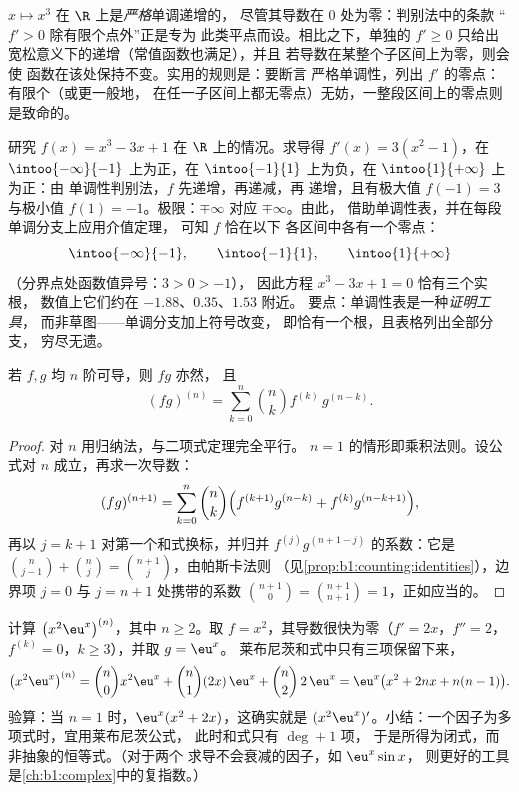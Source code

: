 \begin{example}[免费的严格性]\label{ex:b1:derivative:strictness}
$x \mapsto x^3$ 在 $\R$ 上是\emph{严格}单调递增的，
尽管其导数在 $0$ 处为零：判别法中的条款
“$f' > 0$ 除有限个点外”正是专为
此类平点而设。相比之下，单独的 $f' \geq 0$ 只给出
宽松意义下的递增（常值函数也满足），并且
若导数在某整个子区间上为零，则会使
函数在该处保持不变。实用的规则是：要断言
严格单调性，列出 $f'$ 的零点：有限个（或更一般地，
在任一子区间上都无零点）无妨，一整段区间上的零点则
是致命的。
\end{example}

\begin{example}[完整的单调性分析]\label{ex:b1:derivative:variations}
研究 $f(x) = x^3 - 3x + 1$ 在 $\R$ 上的情况。求导得 $f'(x) =
3(x^2 - 1)$，在 $\intoo{-\infty}{-1}$ 上为正，在
$\intoo{-1}{1}$ 上为负，在 $\intoo{1}{+\infty}$ 上为正：由
单调性判别法，$f$ 先递增，再递减，再
递增，且有极大值 $f(-1) = 3$ 与极小值
$f(1) = -1$。极限：$\mp\infty$ 对应 $\mp\infty$。由此，
借助单调性表，并在每段单调分支上应用介值定理，
可知 $f$ 恰在以下
各区间中各有一个零点：
\[
\intoo{-\infty}{-1}, \qquad \intoo{-1}{1}, \qquad
\intoo{1}{+\infty}
\]
（分界点处函数值异号：$3 > 0 > -1$），
因此方程 $x^3 - 3x + 1 = 0$ 恰有三个实根，
数值上它们约在 $-1.88$、$0.35$、$1.53$ 附近。
要点：单调性表是一种\emph{证明工具}，
而非草图——单调分支加上符号改变，
即恰有一个根，且表格列出全部分支，
穷尽无遗。
\end{example}

\begin{theorem}[莱布尼茨公式]\label{thm:b1:derivative:leibniz}
若 $f, g$ 均 $n$ 阶可导，则 $fg$ 亦然，
且
\[
(fg)^{(n)} = \sum_{k=0}^{n} \binom nk f^{(k)}\, g^{(n-k)} .
\]
\end{theorem}

\begin{proof}
对 $n$ 用归纳法，与二项式定理完全平行。
$n = 1$ 的情形即乘积法则。设公式对
$n$ 成立，再求一次导数：
\[
(fg)^{(n+1)} = \sum_{k=0}^{n} \binom nk
\Bigl( f^{(k+1)} g^{(n-k)} + f^{(k)} g^{(n-k+1)} \Bigr),
\]
再以 $j = k + 1$ 对第一个和式换标，并归并
$f^{(j)} g^{(n+1-j)}$ 的系数：它是 $\binom{n}{j-1} +
\binom nj = \binom{n+1}{j}$，由帕斯卡法则
（见\cref{prop:b1:counting:identities}），边界项 $j = 0$
与 $j = n + 1$ 处携带的系数 $\binom{n+1}{0} = \binom{n+1}{n+1} =
1$，正如应当的。
\end{proof}

\begin{example}[莱布尼茨公式的应用]\label{ex:b1:derivative:leibnizaction}
计算 $\bigl(x^2 \eu^x\bigr)^{(n)}$，其中 $n \geq 2$。取 $f =
x^2$，其导数很快为零（$f' = 2x$，$f'' = 2$，
$f^{(k)} = 0$，$k \geq 3$），并取 $g = \eu^x$。
莱布尼茨和式中只有三项保留下来，
\[
\bigl(x^2\eu^x\bigr)^{(n)}
= \binom n0 x^2 \eu^x + \binom n1 (2x)\,\eu^x + \binom n2\,
2\,\eu^x
= \eu^x\bigl(x^2 + 2nx + n(n-1)\bigr).
\]
验算：当 $n = 1$ 时，$\eu^x(x^2 + 2x)$，这确实就是
$(x^2\eu^x)'$。小结：一个因子为多项式时，宜用莱布尼茨公式，
此时和式只有 $\deg + 1$ 项，
于是所得为闭式，而非抽象的恒等式。（对于两个
求导不会衰减的因子，如 $\eu^x\sin x$，
则更好的工具是\cref{ch:b1:complex}中的复指数。）
\end{example}

